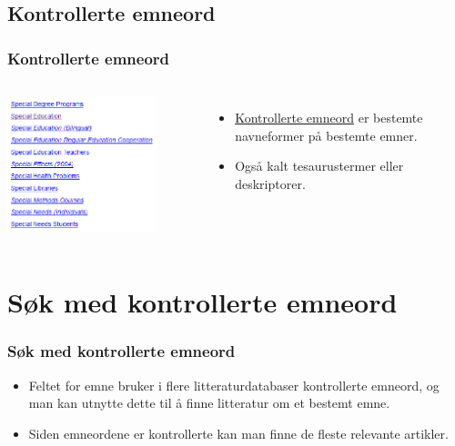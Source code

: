 \documentclass{beamer}
\begin{document}
\subsection{Kontrollerte emneord}
\begin{frame}
  \frametitle{Kontrollerte emneord}
  \begin{columns}
    \centering
    \includegraphics[width=0.8\textwidth]{../media/kontrollerte-emneord.png}

    \begin{itemize}
    \item \href{https://snl.no/emneord}{Kontrollerte emneord} er bestemte navneformer på bestemte emner.
    \item Også kalt tesaurustermer eller deskriptorer.
    \end{itemize}
  \end{columns}
\end{frame}

\section{Søk med kontrollerte emneord}
\begin{frame}
  \frametitle{Søk med kontrollerte emneord}
  \begin{itemize}
  \item \alert{Feltet} for emne bruker i flere litteraturdatabaser \alert{kontrollerte emneord}, og man kan utnytte dette til å finne litteratur om et bestemt emne.
  \item Siden emneordene er kontrollerte kan man finne de fleste relevante artikler.
  \end{itemize}
\end{frame}
\end{document}
